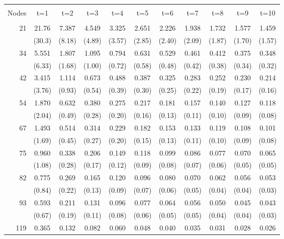 \begin{table}[!h]
\centering
\begin{tabular}{r|cccccccccc}
\hline&&&&&&&&&&\\[-8pt] Nodes & t=1 & t=2 & t=3 & t=4 & t=5 & t=6
& t=7 & t=8 & t=9 & t=10\\[2pt] \hline&&&&&&&&&&\\[-8pt]
  21 & 21.76 & 7.387 & 4.549 & 3.325 & 2.651 & 2.226 & 1.938 & 1.732 & 1.577 & 1.459 \\[-2pt]
     & (30.3) & (8.18) & (4.89) & (3.57) & (2.85) & (2.40) & (2.09) & (1.87) & (1.70) & (1.57)\\[2pt]
  34 & 5.551 & 1.807 & 1.095 & 0.794 & 0.631 & 0.529 & 0.461 & 0.412 & 0.375 & 0.348\\[-2pt]
     & (6.33) & (1.68) & (1.00) & (0.72) & (0.58) & (0.48) & (0.42) & (0.38) & (0.34) & (0.32)\\[2pt]
  42 & 3.415 & 1.114 & 0.673 & 0.488 & 0.387 & 0.325 & 0.283 & 0.252 & 0.230 & 0.214\\[-2pt]
     & (3.76) & (0.93) & (0.54) & (0.39) & (0.30) & (0.25) & (0.22) & (0.19) & (0.17) & (0.16)\\[2pt]
  54 & 1.870 & 0.632 & 0.380 & 0.275 & 0.217 & 0.181 & 0.157 & 0.140 & 0.127 & 0.118\\[-2pt]
     & (2.04) & (0.49) & (0.28) & (0.20) & (0.16) & (0.13) & (0.11) & (0.10) & (0.09) & (0.08)\\[2pt]
  67 & 1.493 & 0.514 & 0.314 & 0.229 & 0.182 & 0.153 & 0.133 & 0.119 & 0.108 & 0.101\\[-2pt]
     & (1.69) & (0.45) & (0.27) & (0.20) & (0.15) & (0.13) & (0.11) & (0.10) & (0.09) & (0.08)\\[2pt]
  75 & 0.960 & 0.338 & 0.206 & 0.149 & 0.118 & 0.099 & 0.086 & 0.077 & 0.070 & 0.065\\[-2pt]
     & (1.08) & (0.28) & (0.17) & (0.12) & (0.09) & (0.08) & (0.07) & (0.06) & (0.05) & (0.05)\\[2pt]
  82 & 0.775 & 0.269 & 0.165 & 0.120 & 0.096 & 0.080 & 0.070 & 0.062 & 0.056 & 0.053\\[-2pt]
     & (0.84) & (0.22) & (0.13) & (0.09) & (0.07) & (0.06) & (0.05) & (0.04) & (0.04) & (0.03)\\[2pt]
  93 & 0.593 & 0.211 & 0.131 & 0.096 & 0.077 & 0.064 & 0.056 & 0.050 & 0.045 & 0.043\\[-2pt]
     & (0.67) & (0.19) & (0.11) & (0.08) & (0.06) & (0.05) & (0.05) & (0.04) & (0.04) & (0.03)\\[2pt]
 119 & 0.365 & 0.132 & 0.082 & 0.060 & 0.048 & 0.040 & 0.035 & 0.031 & 0.028 & 0.026\\[-2pt]

\end{tabular}
\end{table}

